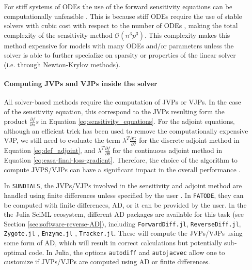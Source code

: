 For stiff systems of ODEs the use of the forward sensitivity equations can be computationally unfeasible \cite{kim_stiff_2021}.
This is because stiff ODEs require the use of stable solvers with cubic cost with respect to the number of ODEs \cite{hairer-solving-2}, making the total complexity of the sensitivity method $\mathcal{O}(n^3p^3)$. 
This complexity makes this method expensive for models with many ODEs and/or parameters unless the solver is able to further specialize on sparsity or properties of the linear solver (i.e. through Newton-Krylov methods). 

\paragraph{Computing JVPs and VJPs inside the solver}
\label{section:computing-vjp-inside-solver}

All solver-based methods require the computation of JVPs or VJPs. 
In the case of the sensitivity equation, this correspond to the JVPs resulting form the product $\frac{\partial f}{\partial u} s $ in Equation \eqref{eq:sensitivity_equations}.
For the adjoint equations, although an efficient trick has been used to remove the computationally expensive VJP, we still need to evaluate the term $\lambda^T \frac{\partial G}{\partial \theta}$ for the discrete adjoint method in Equation \eqref{eq:def_adjoint}, and $\lambda^T \frac{\partial f}{\partial \theta}$ for the continuous adjoint method in Equation \eqref{eq:casa-final-loss-gradient}. 
Therefore, the choice of the algorithm to compute JVPS/VJPs can have a significant impact in the overall performance \cite{Schäfer_Tarek_White_Rackauckas_2021}. 

In \texttt{SUNDIALS}, the JVPs/VJPs involved in the sensitivity and adjoint method are handled using finite differences unless specified by the user \cite{SUNDIALS-hindmarsh2005sundials}.
In \texttt{FATODE}, they can be computed with finite differences, AD, or it can be provided by the user.
In the the Julia SciML ecosystem, different AD packages are available for this task (see Section \ref{sec:software-reverse-AD}), including \texttt{ForwardDiff.jl}, \texttt{ReverseDiff.jl}, \texttt{Zygote.jl} \cite{Innes_Zygote}, \texttt{Enzyme.jl} \cite{moses_Enzyme}, \texttt{Tracker.jl}.
These will compute the JVPs/VJPs using some form of AD, which will result in correct calculations but potentially sub-optimal code. 
In Julia, the options \texttt{autodiff} and \texttt{autojacvec} allow one to customize if JVPs/VJPs are computed using AD or finite differences.  

